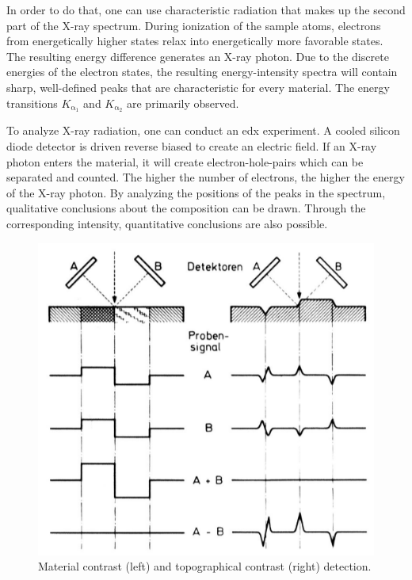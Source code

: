 In order to do that, one can use characteristic radiation that makes up
the second part of the X-ray spectrum.
During ionization of the sample atoms, electrons from energetically
higher states relax into energetically more favorable states.
The resulting energy difference generates an X-ray photon.
Due to the discrete energies of the electron states,
the resulting energy-intensity spectra will contain sharp, well-defined
peaks that are characteristic for every material.
The energy transitions $K_{\mathrm{\alpha}_{1}}$ and
$K_{\mathrm{\alpha}_{2}}$ are primarily observed.

To analyze X-ray radiation, one can conduct an \ac{edx} experiment.
A cooled silicon diode detector is driven reverse biased to create an
electric field.
If an X-ray photon enters the material, it will create electron-hole-pairs
which can be separated and counted.
The higher the number of electrons, the higher the energy of the X-ray
photon.
By analyzing the positions of the peaks in the spectrum, qualitative
conclusions about the composition can be drawn.
Through the corresponding intensity, quantitative conclusions are also
possible.

\begin{figure}[h]
	\centering
	\includegraphics[width=0.95\linewidth]{../assets/material.png}
	\caption{Material contrast (left) and topographical contrast (right) detection.
		}
	\label{fig:material_contrast}
\end{figure}
